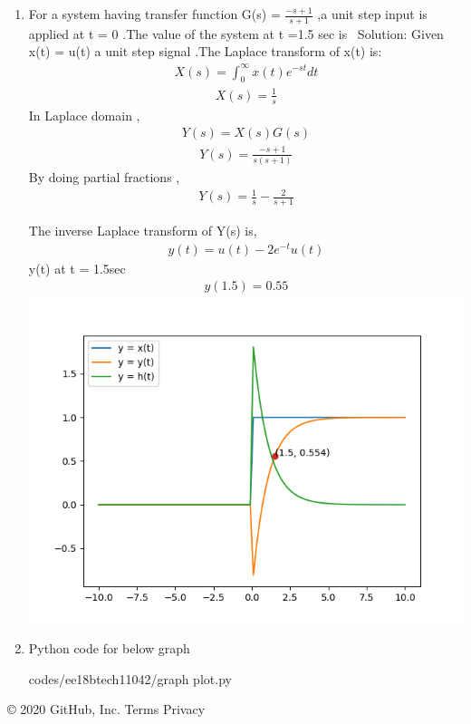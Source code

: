 \begin{enumerate}[label=\thesection.\arabic*.,ref=\thesection.\theenumi]

\item
For a system having transfer function G(s) = $\frac{-s+1}{s+1}$ 
,a unit step input is applied  at t = 0 .The value of the system at t =1.5 sec is
\newline
\ Solution: 
\newline
Given x(t) = u(t) a unit step signal .The Laplace transform of x(t) is:
\begin{align}
X(s) = \int_{0}^{\infty}x(t) e^{-st} dt
\end{align}
\begin{align}
   X(s) = \frac{1}{s}
\end{align}
In Laplace domain ,
\begin{align}
     Y(s) = X(s)G(s)
\end{align}
\begin{align}
    Y(s) = \frac{-s+1}{s(s+1)}
\end{align}
By doing partial fractions ,
\begin{align}
    Y(s) = \frac{1}{s} -\frac{2}{s+1}
\end{align}

The inverse Laplace transform of Y(s) is,
\begin{align}
    y(t) = u(t) - 2e^{-t}u(t)
\end{align}
y(t) at t = 1.5sec
\begin{align}
    y(1.5) = 0.55
\end{align}
\includegraphics[width=1\linewidth]{plotting of functions.png} 
\begin{figure}[!ht]

  \centering
  
    
    \label{fig;Graph}
\end{figure}
\item  Python code for below graph
\begin{1stlisting}
codes/ee18btech11042/graph plot.py
\end{1stlisting}

    
\end{enumerate}

    © 2020 GitHub, Inc.
    Terms
    Privacy
